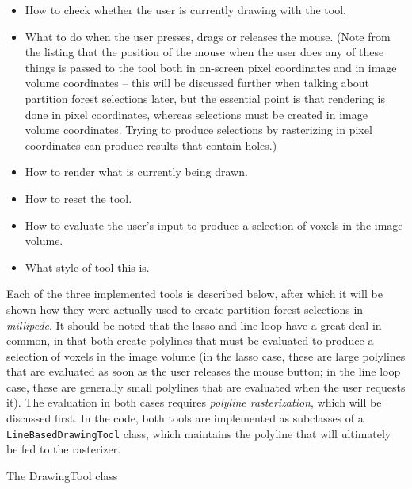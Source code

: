 \begin{itemize}

\item How to check whether the user is currently drawing with the tool.
\item What to do when the user presses, drags or releases the mouse. (Note from the listing that the position of the mouse when the user does any of these things is passed to the tool both in on-screen pixel coordinates and in image volume coordinates -- this will be discussed further when talking about partition forest selections later, but the essential point is that rendering is done in pixel coordinates, whereas selections must be created in image volume coordinates. Trying to produce selections by rasterizing in pixel coordinates can produce results that contain holes.)
\item How to render what is currently being drawn.
\item How to reset the tool.
\item How to evaluate the user's input to produce a selection of voxels in the image volume.
\item What style of tool this is.

\end{itemize}
%
Each of the three implemented tools is described below, after which it will be shown how they were actually used to create partition forest selections in \emph{millipede}. It should be noted that the lasso and line loop have a great deal in common, in that both create polylines that must be evaluated to produce a selection of voxels in the image volume (in the lasso case, these are large polylines that are evaluated as soon as the user releases the mouse button; in the line loop case, these are generally small polylines that are evaluated when the user requests it). The evaluation in both cases requires \emph{polyline rasterization}, which will be discussed first. In the code, both tools are implemented as subclasses of a \texttt{LineBasedDrawingTool} class, which maintains the polyline that will ultimately be fed to the rasterizer.

\begin{stulisting}[p]
\caption{The DrawingTool class}
\label{code:appendixval-drawingtool}

\end{stulisting}

\newpage

